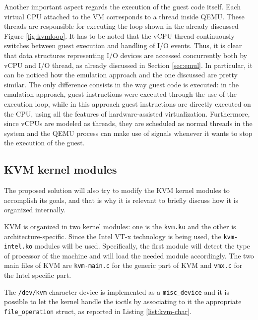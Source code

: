 \par 
Another important aspect regards the execution of the guest code itself. Each virtual CPU attached to the VM corresponds to a thread inside QEMU. These threads are responsible for executing the loop shown in the already discussed Figure \ref{fig:kvmloop}. It has to be noted that the vCPU thread continuously switches between guest execution and handling of I/O events. Thus, it is clear that data structures representing I/O devices are accessed concurrently both by vCPU and I/O thread, as already discussed in Section \ref{sec:emul}. In particular, it can be noticed how the emulation approach and the one discussed are pretty similar. The only difference consists in the way guest code is executed: in the emulation approach, guest instructions were executed through the use of the execution loop, while in this approach guest instructions are directly executed on the CPU, using all the features of hardware-assisted virtualization. Furthermore, since vCPUs are modeled as threads, they are scheduled as normal threads in the system and the QEMU process can make use of signals whenever it wants to stop the execution of the guest. 

\subsection{KVM kernel modules}
The proposed solution will also try to modify the KVM kernel modules to accomplish its goals, and that is why it is relevant to briefly discuss how it is organized internally. 
\par 
KVM is organized in two kernel modules: one is the \texttt{kvm.ko} and the other is architecture-specific. Since the Intel VT-x technology is being used, the \texttt{kvm-intel.ko} modules will be used. Specifically, the first module will detect the type of processor of the machine and will load the needed module accordingly. The two main files of KVM are \texttt{kvm-main.c} for the generic part of KVM and \texttt{vmx.c} for the Intel specific part. 
\par 
The \texttt{/dev/kvm} character device is implemented as a \texttt{misc\_device} and it is possible to let the kernel handle the ioctls by associating to it the appropriate \texttt{file\_operation} struct, as reported in Listing \ref{list:kvm-char}.

